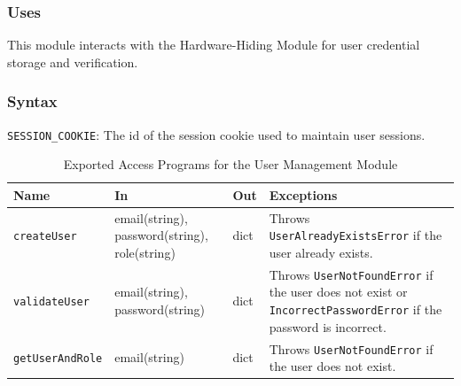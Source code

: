 \documentclass[12pt, titlepage]{article}
\begin{document}
\begin{description}
\subsubsection{Uses}
This module interacts with the Hardware-Hiding Module for user credential
storage and verification.

\subsubsection{Syntax}
\begin{description}
  \item[Exported Constants and Access Programs:]
  \item 
  \texttt{SESSION\_COOKIE}: The id of the session cookie used to maintain user sessions.
  
  \begin{table}[H]
    \centering
    \begin{tabular}{p{} p{} p{}
    p{}}
    \toprule
    \textbf{Name} & \textbf{In} & \textbf{Out} & \textbf{Exceptions}\\
    \midrule
    
    \texttt{createUser} & email(string), password(string), role(string) & dict &
    Throws \texttt{UserAlreadyExistsError} if the user already exists.\\
    \midrule
    
    \texttt{validateUser} & email(string), password(string) & dict & Throws
    \texttt{UserNotFoundError} if the user does not exist or
    \texttt{IncorrectPasswordError} if the password is incorrect.\\
    \midrule

    \texttt{getUserAndRole} & email(string) & dict & Throws
    \texttt{UserNotFoundError} if the user does not exist.\\
    \bottomrule

    \end{tabular}
    \caption{Exported Access Programs for the User Management Module}
    \label{TblEAP_UM}
  \end{table}
\end{description}


\end{description}
\end{document}
